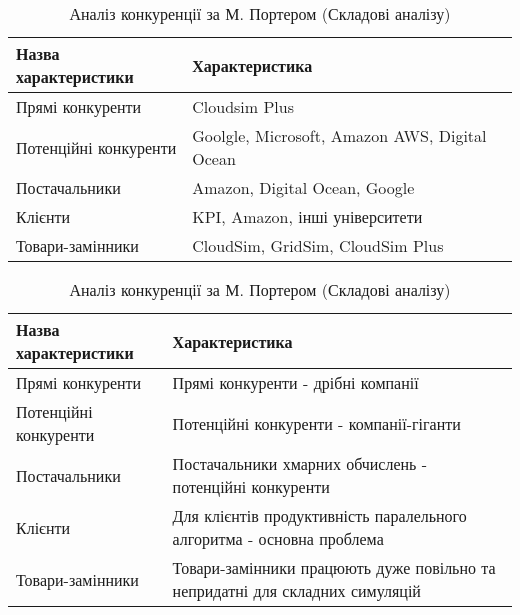 \begin{table}[H]
	\centering
	\caption{Аналіз конкуренції за М. Портером (Висновки)}
	\begin{tabular}
		{|l|p{10cm}|} \hline
		\bf{Назва характеристики} & \bf{Характеристика}
		\\ \hline
		
		Прямі конкуренти & Cloudsim Plus
		\\ \hline
		
		Потенційні конкуренти & Goolgle, Microsoft, Amazon AWS, Digital Ocean
		\\ \hline
		
		Постачальники & Amazon, Digital Ocean, Google
		\\ \hline
		
		Клієнти & KPI, Amazon, інші університети
		\\ \hline
		
		Товари-замінники & CloudSim, GridSim, CloudSim Plus
		\\ \hline
	\end{tabular}
	\caption{Аналіз конкуренції за М. Портером (Складові аналізу)}
	\begin{tabular}
		{|l|p{10cm}|} \hline
		\bf{Назва характеристики} & \bf{Характеристика}
		\\ \hline
		
		Прямі конкуренти & Прямі конкуренти - дрібні компанії
		\\ \hline
		
		Потенційні конкуренти & Потенційні конкуренти - компанії-гіганти
		\\ \hline
		
		Постачальники & Постачальники хмарних обчислень - потенційні конкуренти
		\\ \hline
		
		Клієнти & Для клієнтів продуктивність паралельного алгоритма - основна проблема
		\\ \hline
		
		Товари-замінники & Товари-замінники працюють дуже повільно та непридатні для складних симуляцій
		\\ \hline
	\end{tabular}
\end{table}

